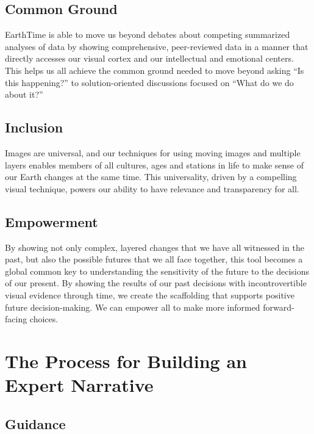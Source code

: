\documentclass[
]{krantz}
\begin{document}
\hypertarget{common-ground}{%
\subsection*{Common Ground}\label{common-ground}}


EarthTime is able to move us beyond debates about competing summarized analyses of data by showing comprehensive, peer-reviewed data in a manner that directly accesses our visual cortex and our intellectual and emotional centers. This helps us all achieve the common ground needed to move beyond asking ``Is this happening?'' to solution-oriented discussions focused on ``What do we do about it?''

\hypertarget{inclusion}{%
\subsection*{Inclusion}\label{inclusion}}


Images are universal, and our techniques for using moving images and multiple layers enables members of all cultures, ages and stations in life to make sense of our Earth changes at the same time. This universality, driven by a compelling visual technique, powers our ability to have relevance and transparency for all.

\hypertarget{empowerment}{%
\subsection*{Empowerment}\label{empowerment}}


By showing not only complex, layered changes that we have all witnessed in the past, but also the possible futures that we all face together, this tool becomes a global common key to understanding the sensitivity of the future to the decisions of our present. By showing the results of our past decisions with incontrovertible visual evidence through time, we create the scaffolding that supports positive future decision-making. We can empower all to make more informed forward-facing choices.

\hypertarget{the-process-for-building-an-expert-narrative}{%
\section{The Process for Building an Expert Narrative}\label{the-process-for-building-an-expert-narrative}}

\hypertarget{guidance}{%
\subsection*{Guidance}\label{guidance}}
\end{document}
